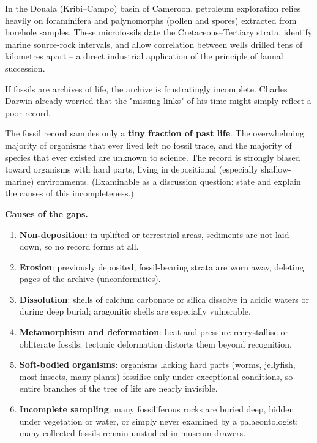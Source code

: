 \documentclass[11pt]{article}
\newcounter{popsec}
\newcounter{popsub}
\newcommand{\courssub}[1]{%
  \stepcounter{popsub}%
  \par\vspace{9pt}\noindent{\popxbold\fontsize{11.5}{13}\selectfont\color{popink}{\color{poporange}\thepopsec.\thepopsub}\hspace{6pt}#1}\par\nopagebreak\vspace{4pt}
}
\begin{document}
\begin{savaistu}
In the Douala (Kribi--Campo) basin of Cameroon, petroleum exploration relies heavily on foraminifera and palynomorphs (pollen and spores) extracted from borehole samples. These microfossils date the Cretaceous--Tertiary strata, identify marine source-rock intervals, and allow correlation between wells drilled tens of kilometres apart -- a direct industrial application of the principle of faunal succession.
\end{savaistu}

\courssub{Gaps in the Fossil Record}

If fossils are archives of life, the archive is frustratingly incomplete. Charles Darwin already worried that the "missing links" of his time might simply reflect a poor record.

\begin{propriete}
The fossil record samples only a \textbf{tiny fraction of past life}. The overwhelming majority of organisms that ever lived left no fossil trace, and the majority of species that ever existed are unknown to science. The record is strongly biased toward organisms with hard parts, living in depositional (especially shallow-marine) environments. (Examinable as a discussion question: state and explain the causes of this incompleteness.)
\end{propriete}

\textbf{Causes of the gaps.}

\begin{enumerate}
\item \textbf{Non-deposition}: in uplifted or terrestrial areas, sediments are not laid down, so no record forms at all.
\item \textbf{Erosion}: previously deposited, fossil-bearing strata are worn away, deleting pages of the archive (unconformities).
\item \textbf{Dissolution}: shells of calcium carbonate or silica dissolve in acidic waters or during deep burial; aragonitic shells are especially vulnerable.
\item \textbf{Metamorphism and deformation}: heat and pressure recrystallise or obliterate fossils; tectonic deformation distorts them beyond recognition.
\item \textbf{Soft-bodied organisms}: organisms lacking hard parts (worms, jellyfish, most insects, many plants) fossilise only under exceptional conditions, so entire branches of the tree of life are nearly invisible.
\item \textbf{Incomplete sampling}: many fossiliferous rocks are buried deep, hidden under vegetation or water, or simply never examined by a palaeontologist; many collected fossils remain unstudied in museum drawers.
\end{enumerate}
\end{document}
